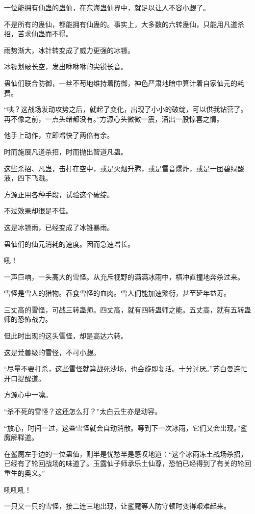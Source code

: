 \begin{this_body}
一位能拥有仙蛊的蛊仙，在东海蛊仙界中，就足以让人不容小觑了。

不是所有的蛊仙，都能拥有仙蛊的。事实上，大多数的六转蛊仙，只能用凡道杀招，苦求仙蛊而不得。

雨势渐大，冰针转变成了威力更强的冰镖。

冰镖划破长空，发出咻咻咻的尖锐长音。

蛊仙们联合防御，一丝不苟地维持着防御，神色严肃地暗中算计着自家仙元的耗费。

“咦？这战场发动攻势之后，就起了变化，出现了小小的破绽，可以供我钻营了。再不像之前，一点头绪都没有。”方源心头微微一震，涌出一股惊喜之情。

他手上动作，立即增快了两倍有余。

时而施展凡道杀招，时而抛出智道凡蛊。

这些杀招、凡蛊，击打在空中，或是火烟升腾，或是雷音爆炸，或是一团碧绿酸液，四下飞溅。

方源正用各种手段，试验这个破绽。

不过效果却很是不佳。

这是冰镖雨，已经变成了冰锥暴雨。

蛊仙们的仙元消耗的速度。因而急速增长。

吼！

一声巨响，一头高大的雪怪。从充斥视野的满满冰雨中，横冲直撞地奔杀过来。

雪怪是雪人的猎物。吞食雪怪的血肉。雪人们能加速繁衍，甚至延年益寿。

三丈高的雪怪，可战三转蛊师。四丈高，就有四转蛊师之能。五丈高，就有五转蛊师的恐怖战力。

但此时出现的这头雪怪，却是高达六转。

这是荒兽级的雪怪，不可小觑。

“尽量不要打杀，这些雪怪就算战死沙场，也会旋即复活。十分讨厌。”苏白曼连忙开口提醒道。

方源心中一凛。

“杀不死的雪怪？这还怎么打？”太白云生亦是动容。

“放心，时间一过，这些雪怪就会自动消散。等到下一次冰雨，它们又会出现。”鲨魔解释道。

在鲨魔左手边的一位蛊仙，则半是忧愁半是感叹地道：“这个冰雨冻土战场杀招，已经有了轮回战场的味道了。玉露仙子师承乐土仙尊，恐怕已经得到了有关的轮回重生的奥义。”

吼吼吼！

一只又一只的雪怪，接二连三地出现，让鲨魔等人防守顿时变得艰难起来。


\end{this_body}
